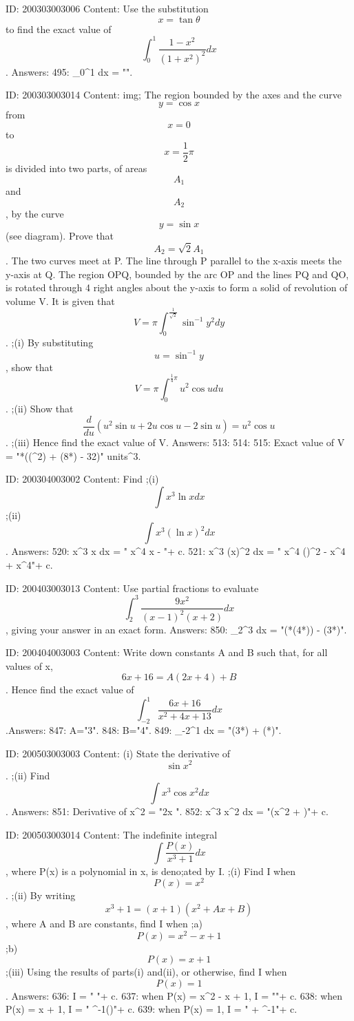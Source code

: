 \documentclass{article}
\begin{document}
ID: 200303003006
Content:
Use the substitution  $$x = \tan \theta $$ to find the exact value of  $$\int_0^1 \frac{1-x^2}{( 1 + x^2  )^2} dx $$. Answers:
495: \int_0^1  dx = "".

ID: 200303003014
Content:
img; The region bounded by the axes and the curve $$y = \cos x$$ from $$x = 0$$ to  $$x = \frac{1}{2}\pi $$ is divided into two parts, of areas  $$A_1 $$ and  $$A_2 $$, by the curve $$y = \sin x$$ (see diagram). Prove that  $$A_2  = \sqrt 2 A_1 $$. The two curves meet at P. The line through P parallel to the x-axis meets the y-axis at Q. The region OPQ, bounded by the arc OP and the lines PQ and QO, is rotated through 4 right angles about the y-axis to form a   solid of revolution of volume V. It is given that  $$V = \pi \int_0^{\frac {1}{\sqrt 2}} \sin^{-1} y^2 dy $$. ;(i) By substituting  $$u = \sin ^{-1} y$$, show that  $$V = \pi \int_0^{\frac{1}{4}\pi} u^2 \cos udu $$. ;(ii) Show that  $$\frac{d}{du} ( u^2 \sin u + 2u\cos u - 2\sin u) = u^2 \cos u$$. ;(iii) Hence find the exact value of V.  Answers:
513: 
514: 
515: Exact value of V = "*((\pi^2) + (8*\pi) - 32)" units^3.

ID: 200304003002
Content:
Find ;(i) $$\int x^3 \ln xdx $$ ;(ii)  $$\int x^3 ( \ln x )^2 dx $$. Answers:
520: \int x^3 \ln x dx = " x^4 x - "+ c.
521: \int x^3 (\ln x)^2 dx = " x^4 ()^2 -  x^4  +  x^4"+ c.

ID: 200403003013
Content:
Use partial fractions to evaluate  $$\int_2^3 \frac{9x^2}{( x - 1 )^2 ( x + 2 )}dx $$, giving your answer in an exact form. Answers:
850: \int_2^3  dx = "(*(4*)) - (3*)".

ID: 200404003003
Content:
Write down constants A and B such that, for all values of x, $$6x + 16 = A (2x + 4) + B$$. Hence find the exact value of  $$\int_{-2}^{1} \frac{6x + 16}{x^2  + 4x + 13} dx $$.Answers:
847: A="3".
848: B="4".
849: \int_{-2}^{1}  dx = "(3*) + (*\pi)".

ID: 200503003003
Content:
(i) State the derivative of  $$\sin {x^2}$$.  ;(ii) Find $$\int x^3 \cos { x^2 } dx$$. Answers:
851: Derivative of \sin x^2 = "2x ".
852: \int x^3 \cos x^2 dx = "(x^2  + )"+ c.

ID: 200503003014
Content:
The indefinite integral $$\int \frac{P( x )}{x^3 + 1} dx$$, where P(x) is a polynomial in x, is deno;ated by I. ;(i) Find I when $$P( x ) = x^2$$. ;(ii) By writing $$x^3 + 1 = ( x + 1 )( x^2 + Ax + B )$$, where A and B are constants, find I when ;a)$$P(x) = x^2 - x + 1$$ ;b)$$P(x) = x + 1$$;(iii) Using the results of parts(i) and(ii), or otherwise, find I when $$P(x) = 1$$. Answers:
636: I = " "+ c.
637: when P(x) = x^2 - x + 1, I = ""+ c.
638: when P(x) = x + 1, I = "  \tan^{-1}{\left(\right)}"+ c.
639: when P(x) = 1, I = "  + \tan^{-1}{}"+ c.
\end{document}
